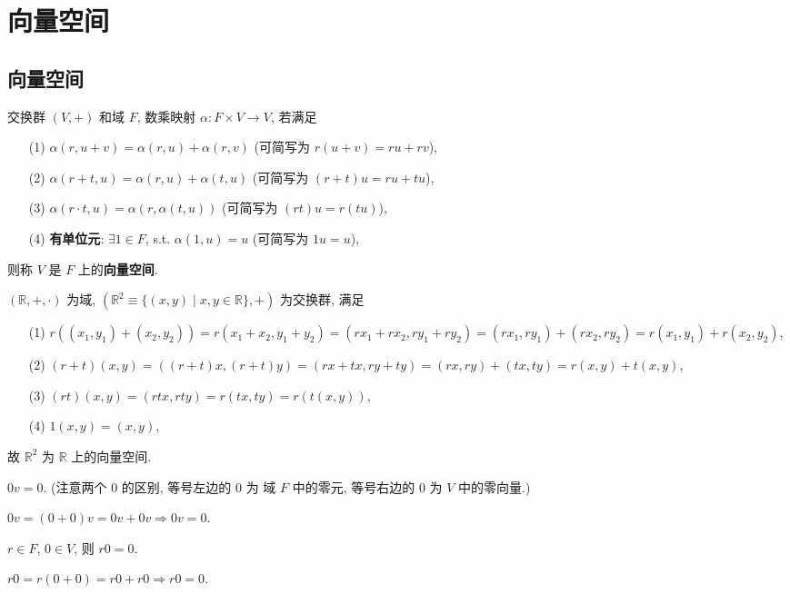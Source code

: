 \documentclass{note}
\begin{document}
\fi
\chapter{向量空间}
\section{向量空间}
\begin{df}[向量空间]
    交换群 $(V,+)$ 和域 $F$, 数乘映射 $\alpha:F\times V\rightarrow V$, 若满足
    \begin{itemize}
        \item[(1)] $\alpha(r,u+v)=\alpha(r,u)+\alpha(r,v)$ (可简写为 $r(u+v)=ru+rv$),
        \item[(2)] $\alpha(r+t,u)=\alpha(r,u)+\alpha(t,u)$ (可简写为 $(r+t)u=ru+tu$),
        \item[(3)] $\alpha(r\cdot t,u)=\alpha(r,\alpha(t,u))$ (可简写为 $(rt)u=r(tu)$),
        \item[(4)] \textbf{有单位元}: $\exists 1\in F$, s.t. $\alpha(1,u)=u$ (可简写为 $1u=u$),
    \end{itemize}
    则称 $V$ 是 $F$ 上的\textbf{向量空间}.
\end{df}

\begin{eg}[直角坐标系]
    $(\mathbb{R},+,\cdot)$ 为域, $(\mathbb{R}^2\equiv\{(x,y)\mid x,y\in\mathbb{R}\},+)$ 为交换群, 满足
    \begin{itemize}
        \item[(1)] $r((x_1,y_1)+(x_2,y_2))=r(x_1+x_2,y_1+y_2)=(rx_1+rx_2,ry_1+ry_2)=(rx_1,ry_1)+(rx_2,ry_2)=r(x_1,y_1)+r(x_2,y_2)$,
        \item[(2)] $(r+t)(x,y)=((r+t)x,(r+t)y)=(rx+tx,ry+ty)=(rx,ry)+(tx,ty)=r(x,y)+t(x,y)$,
        \item[(3)] $(rt)(x,y)=(rtx,rty)=r(tx,ty)=r(t(x,y))$,
        \item[(4)] $1(x,y)=(x,y)$,
    \end{itemize}
    故 $\mathbb{R}^2$ 为 $\mathbb{R}$ 上的向量空间.
\end{eg}

$0v=0$. (注意两个 $0$ 的区别, 等号左边的 $0$ 为 域 $F$ 中的零元, 等号右边的 $0$ 为 $V$ 中的零向量.)
\begin{pf}
    $0v=(0+0)v=0v+0v\Longrightarrow 0v=0$.
\end{pf}

$r\in F$, $0\in V$, 则 $r0=0$.
\begin{pf}
    $r0=r(0+0)=r0+r0\Longrightarrow r0=0$.
\end{pf}
\end{document}
